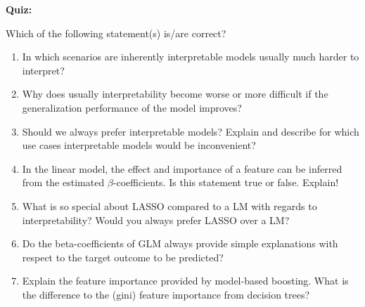 \textbf{Quiz:}\\ \noindent
\vspace{0.1cm}

Which of the following statement(s) is/are correct?  
        	\begin{enumerate}
        	\item In which scenarios are inherently interpretable models usually much harder to interpret?
        	\item Why does usually interpretability become worse or more difficult if the generalization performance of the model improves?
        	\item Should we always prefer interpretable models? Explain and describe for which use cases interpretable models would be inconvenient?
        	\item In the linear model, the effect and importance of a feature can be inferred from the estimated $\beta$-coefficients. Is this statement true or false. Explain!
        	\item What is so special about LASSO compared to a LM with regards to interpretability? Would you always prefer LASSO over a LM?
        	\item Do the beta-coefficients of GLM always provide simple explanations with respect to the target outcome to be predicted? 
        	\item Explain the feature importance provided by model-based boosting. What is the difference to the (gini) feature importance from decision trees?
        \end{enumerate}